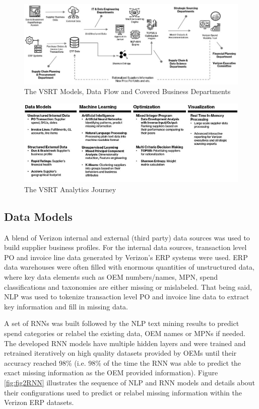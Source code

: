 \documentclass[inte,nonblindrev]{informs3} %
\begin{document}
 
\begin{figure}
	\includegraphics[width=1.0\textwidth]{FlowGraph.jpg}
    \caption{The VSRT Models, Data Flow and Covered Business Departments}
    \label{fig:fig2}
\end{figure}


\begin{figure}
	\includegraphics{Journey.jpg}
    \caption{The VSRT Analytics Journey}
    \label{fig:fig2Journey}
\end{figure}

\subsection{Data Models}
A blend of Verizon internal and external (third party) data sources was used to build supplier business profiles. For the internal data sources, transaction level PO and invoice line data generated by Verizon's ERP systems were used. ERP data warehouses were often filled with enormous quantities of unstructured data, where key data elements such as OEM numbers/names, MPN, spend classifications and taxonomies are either missing or mislabeled. That being said, NLP was used to tokenize transaction level PO and invoice line data to extract key information and fill in missing data. 

A set of RNNs was built followed by the NLP text mining results to predict spend categories or relabel the existing data, OEM names or MPNs if needed. The developed RNN models have multiple hidden layers and were trained and retrained iteratively on high quality datasets provided by OEMs until their accuracy reached 98\% (i.e. 98\% of the time the RNN was able to predict the exact missing information as the OEM provided information). Figure \ref{fig:fig2RNN} illustrates the sequence of NLP and RNN models and details about their configurations used to predict or relabel missing information within the Verizon ERP datasets.
\end{document}
